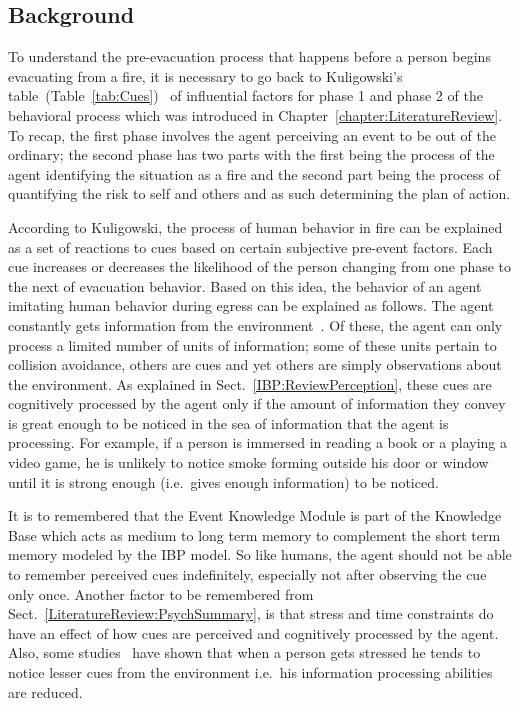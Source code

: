 \subsection{Background}
\label{CFW:EKMBackground}
To understand the pre-evacuation process that happens before a person begins evacuating from a fire, it is necessary to go back to Kuligowski's table~(Table~\ref{tab:Cues})~\cite{Kuligowski:2009un} of influential factors for phase 1 and phase 2 of the behavioral process which was introduced in Chapter~\ref{chapter:LiteratureReview}. To recap, the first phase involves the agent perceiving an event to be out of the ordinary; the second phase has two parts with the first being the process of the agent identifying the situation as a fire and the second part being the process of quantifying the risk to self and others and as such determining the plan of action.

According to Kuligowski, the process of human behavior in fire can be explained as a set of reactions to cues based on certain subjective pre-event factors. Each cue increases or decreases the likelihood of the person changing from one phase to the next of evacuation behavior. Based on this idea, the behavior of an agent imitating human behavior during egress can be explained as follows. The agent constantly gets information from the environment~\cite{Simon:1970th}. Of these, the agent can only process a limited number of units of information; some of these units pertain to collision avoidance, others are cues and yet others are simply observations about the environment. As explained in Sect.~\ref{IBP:ReviewPerception}, these cues are cognitively processed by the agent only if the amount of information they convey is great enough to be noticed in the sea of information that the agent is processing. For example, if a person is immersed in reading a book or a playing a video game, he is unlikely to notice smoke forming outside his door or window until it is strong enough (i.e.\ gives enough information) to be noticed.

It is to remembered that the Event Knowledge Module is part of the Knowledge Base which acts as medium to long term memory to complement the short term memory modeled by the IBP model. So like humans, the agent should not be able to remember perceived cues indefinitely, especially not after observing the cue only once. Another factor to be remembered from Sect.~\ref{LiteratureReview:PsychSummary}, is that stress and time constraints do have an effect of how cues are perceived and cognitively processed by the agent. Also, some studies~\cite{Ozel:2001tn} have shown that when a person gets stressed he tends to notice lesser cues from the environment i.e.\ his information processing abilities are reduced.

